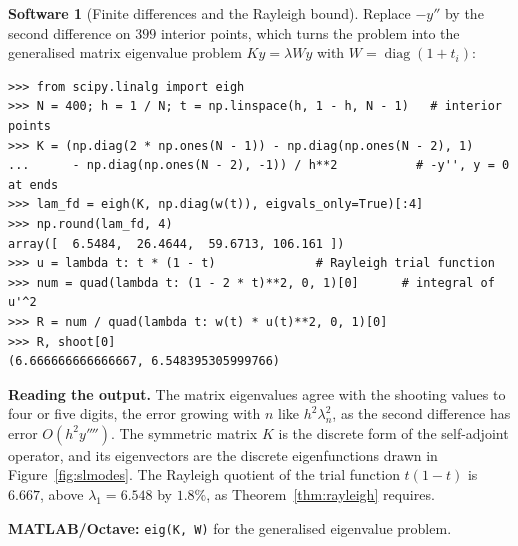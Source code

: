\documentclass[11pt,a4paper]{article}
\numberwithin{equation}{section}
\theoremstyle{definition}
\newtheorem{software}[thm]{Software}
\begin{document}
\begin{software}[Finite differences and the Rayleigh bound]
\label{sw:slfd}
Replace $-y''$ by the second difference on $399$ interior points, which turns the problem into the generalised matrix eigenvalue problem $Ky = \lambda Wy$ with $W = \operatorname{diag}(1 + t_i)$:
{\small\begin{verbatim}
>>> from scipy.linalg import eigh
>>> N = 400; h = 1 / N; t = np.linspace(h, 1 - h, N - 1)   # interior points
>>> K = (np.diag(2 * np.ones(N - 1)) - np.diag(np.ones(N - 2), 1)
...      - np.diag(np.ones(N - 2), -1)) / h**2           # -y'', y = 0 at ends
>>> lam_fd = eigh(K, np.diag(w(t)), eigvals_only=True)[:4]
>>> np.round(lam_fd, 4)
array([  6.5484,  26.4644,  59.6713, 106.161 ])
>>> u = lambda t: t * (1 - t)              # Rayleigh trial function
>>> num = quad(lambda t: (1 - 2 * t)**2, 0, 1)[0]      # integral of u'^2
>>> R = num / quad(lambda t: w(t) * u(t)**2, 0, 1)[0]
>>> R, shoot[0]
(6.666666666666667, 6.548395305999766)
\end{verbatim}}
\textbf{Reading the output.} The matrix eigenvalues agree with the shooting values to four or five digits, the error growing with $n$ like $h^2\lambda_n^2$, as the second difference has error $O(h^2y'''')$. The
symmetric matrix $K$ is the discrete form of the self-adjoint operator, and its eigenvectors are the discrete eigenfunctions drawn in Figure~\ref{fig:slmodes}. The Rayleigh quotient of the trial function
$t(1 - t)$ is $6.667$, above $\lambda_1 = 6.548$ by $1.8\%$, as Theorem~\ref{thm:rayleigh} requires.

\textbf{MATLAB/Octave:} \texttt{eig(K, W)} for the generalised eigenvalue problem.
\end{software}
\end{document}
